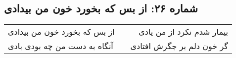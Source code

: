 \begin{center}
\section*{شماره ۲۶: از بس که بخورد خون من بیدادی}
\label{sec:026}
\begin{longtable}{l p{0.5cm} r}
از بس که بخورد خون من بیدادی
&&
بیمار شدم نکرد از من یادی
\\
آنگاه به دست من چه بودی بادی
&&
گر خون دلم بر جگرش افتادی
\\
\end{longtable}
\end{center}
